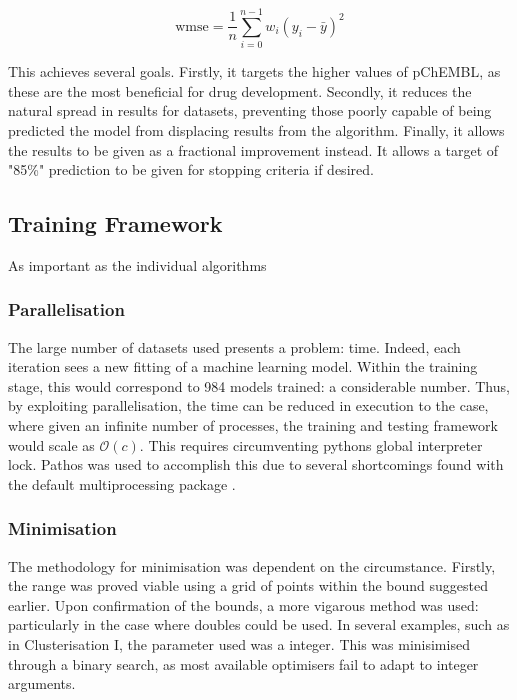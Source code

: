 \begin{equation}
    \mathrm{wmse}=\frac{1}{n}\sum_{i=0}^{n-1}{w_i(y_i-\bar{y})^2}
    \label{eq:wmse}
\end{equation}

This achieves several goals. Firstly, it targets the higher values of pChEMBL, as these are the most beneficial for drug development. Secondly, it reduces the natural spread in results for datasets, preventing those poorly capable of being predicted the model from displacing results from the algorithm. Finally, it allows the results to be given as a fractional improvement instead. It allows a target of "85\%" prediction to be given for stopping criteria if desired.


\subsection{Training Framework}
As important as the individual algorithms
\subsubsection{Parallelisation}
The large number of datasets used presents a problem: time. Indeed, each iteration sees a new fitting of a machine learning model. Within the training stage, this would correspond to 984 models trained: a considerable number. Thus, by exploiting parallelisation, the time can be reduced in execution to the case, where given an infinite number of processes, the training and testing framework would scale as $\mathcal{O}(c)$. This requires circumventing pythons global interpreter lock. Pathos was used to accomplish this due to several shortcomings found with the default multiprocessing package \cite{pathos1,pathos2}.

\subsubsection{Minimisation}
The methodology for minimisation was dependent on the circumstance. Firstly, the range was proved viable using a grid of points within the bound suggested earlier. Upon confirmation of the bounds, a more vigarous method was used: particularly in the case where doubles could be used. In several examples, such as in Clusterisation I, the parameter used was a integer. This was minisimised through a binary search, as most available optimisers fail to adapt to integer arguments.
\blindtext[1]